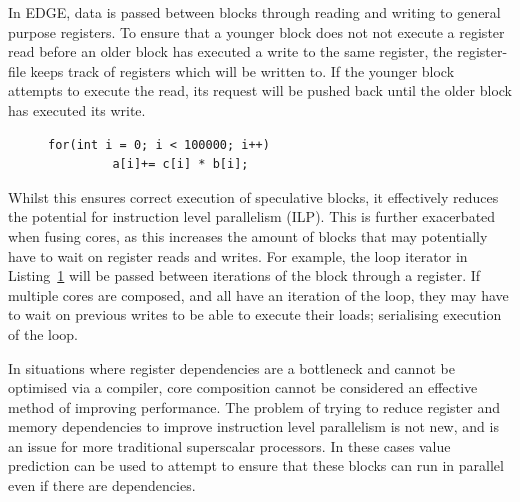 In EDGE, data is passed between blocks through reading and writing to general purpose registers.
To ensure that a younger block does not not execute a register read before an older block has executed a write to the same register, the register-file keeps track of registers which will be written to.
If the younger block attempts to execute the read, its request will be pushed back until the older block has executed its write.


\begin{figure}[t]
\lstset{language=C,numbersep=4pt}
\begin{center}
\begin{lstlisting}
for(int i = 0; i < 100000; i++)
         a[i]+= c[i] * b[i];
\end{lstlisting}
\end{center}
\vspace{-1em}
\label{lst:chp3:small}
\vspace{1em}
\end{figure}

Whilst this ensures correct execution of speculative blocks, it effectively reduces the potential for instruction level parallelism (ILP).
This is further exacerbated when fusing cores, as this increases the amount of blocks that may potentially have to wait on register reads and writes.
For example, the loop iterator in Listing~\ref{lst:chp3:small} will be passed between iterations of the block through a register.
If multiple cores are composed, and all have an iteration of the loop, they may have to wait on previous writes to be able to execute their loads; serialising execution of the loop.

In situations where register dependencies are a bottleneck and cannot be optimised via a compiler, core composition cannot be considered an effective method of improving performance.
The problem of trying to reduce register and memory dependencies to improve instruction level parallelism is not new, and is an issue for more traditional superscalar processors.
In these cases value prediction can be used to attempt to ensure that these blocks can run in parallel even if there are dependencies.


